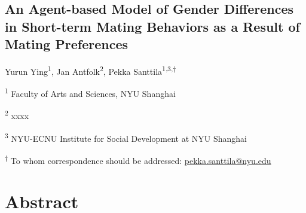 \documentclass[
  11pt,
]{article}
\author{}
\date{\vspace{-2.5em}}
\begin{document}
\begin{titlepage}

\begin{center}

\vspace*{30mm}

\hypertarget{an-agent-based-model-of-gender-differences-in-short-term-mating-behaviors-as-a-result-of-mating-preferences}{%
\section*{An Agent-based Model of Gender Differences in Short-term
Mating Behaviors as a Result of Mating
Preferences}\label{an-agent-based-model-of-gender-differences-in-short-term-mating-behaviors-as-a-result-of-mating-preferences}}

\vspace{30mm}

Yurun Ying\textsuperscript{1}, Jan Antfolk\textsuperscript{2}, Pekka
Santtila\textsuperscript{1,3,\(\dagger\)}

\textsuperscript{1} Faculty of Arts and Sciences, NYU Shanghai

\textsuperscript{2} xxxx

\textsuperscript{3} NYU-ECNU Institute for Social Development at NYU
Shanghai

\end{center}

\vspace{40mm}

\textsuperscript{\(\dagger\)} To whom correspondence should be
addressed: \url{pekka.santtila@nyu.edu}

\end{titlepage}

\newpage

\hypertarget{abstract}{%
\section*{Abstract}\label{abstract}}
\end{document}
